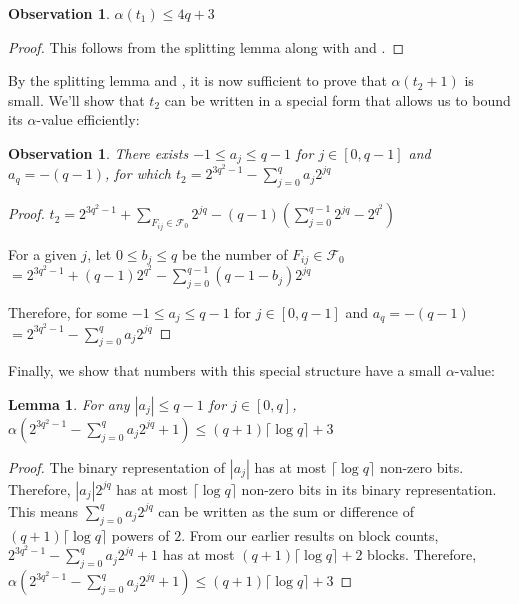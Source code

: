 \documentclass[11pt,a4paper]{article}
\newtheorem{lemma}[theorem]{Lemma}
\newtheorem{observation}[theorem]{Observation}
\theoremstyle{definition}
\begin{document}
\begin{observation}\label{mid_alpha_sets}
	$\alpha(t_1) \leq 4q+3 $   
\end{observation}

\begin{proof}
	This follows from the splitting lemma along with  and 
	.
\end{proof}

By the splitting lemma and , it is now sufficient to prove that 
$\alpha(t_2+1)$ is small. We'll show that $t_2$ can be written in a special 
form that allows us to bound its $\alpha$-value efficiently:

\begin{observation}\label{pre_final_alpha_count}
	There exists $-1 \leq a_j \leq q-1$ for $j \in [0,q-1]$ and $a_q=-(q-1)$, 
	for which 
	$t_2 = 2^{3q^2-1}-\sum_{j=0}^{q} a_j2^{jq}$
\end{observation}

\begin{proof}
	$t_2= 2^{3q^2-1}+\sum_{F_{ij}\in \mathcal{F}_0} 2^{jq} - (q-1)
	(\sum_{j=0}^{q-1} 2^{jq} - 2^{q^2})$
	
	For a given $j$, let $0\leq b_j\leq q$ be the number of $F_{ij} \in 
	\mathcal{F}_0$
	$= 2^{3q^2-1} + (q-1)2^{q^2} - \sum_{j=0}^{q-1} (q-1-b_j)2^{jq}$
	
	Therefore, for some $-1 \leq a_j \leq q-1$ for $j \in [0,q-1]$ and 
	$a_q=-(q-1)$
	$=2^{3q^2-1} - \sum_{j=0}^{q} a_j2^{jq} $
\end{proof}

Finally, we show that numbers with this special structure have a small 
$\alpha$-value:

\begin{lemma}\label{final_alpha_count}
	For any $|a_j| \leq q-1$ for $j \in [0,q]$, 
	$\alpha(2^{3q^2-1}-\sum_{j=0}^{q} a_j2^{jq} + 1) \leq (q+1)\lceil 
	\log{q} \rceil+3$
\end{lemma}

\begin{proof}
	The binary representation of $|a_j|$ has at most $\lceil \log{q} \rceil$ 
	non-zero bits. Therefore, $|a_j|2^{jq}$ has at most $\lceil \log{q} \rceil$ 
	non-zero bits in its binary representation. This means $\sum_{j=0}^{q} 
	a_j2^{jq}$ can be written as the sum or difference of $(q+1)\lceil \log{q} 
	\rceil$ powers of $2$. From our earlier results on block counts,  
	$2^{3q^2-1}-\sum_{j=0}^{q} a_j2^{jq} + 1$ has at most $(q+1)\lceil 
	\log{q} \rceil+2$ blocks. Therefore,
	$\alpha(2^{3q^2-1}-\sum_{j=0}^{q} a_j2^{jq} + 1) \leq (q+1)\lceil 
	\log{q} \rceil+3$
\end{proof}
\end{document}
